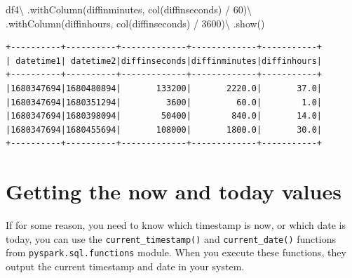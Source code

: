 \documentclass[
  11pt,
  letterpaper,
  DIV=11,
  numbers=noendperiod]{scrreprt}
\newenvironment{Shaded}{\begin{snugshade}}{\end{snugshade}}
\newcommand{\DecValTok}[1]{\textcolor[rgb]{0.68,0.00,0.00}{#1}}
\newcommand{\NormalTok}[1]{\textcolor[rgb]{0.00,0.23,0.31}{#1}}
\newcommand{\OperatorTok}[1]{\textcolor[rgb]{0.37,0.37,0.37}{#1}}
\newcommand{\StringTok}[1]{\textcolor[rgb]{0.13,0.47,0.30}{#1}}
\begin{document}
\begin{Shaded}
\begin{Highlighting}[]
\NormalTok{df4}\OperatorTok{\textbackslash{}}
\NormalTok{    .withColumn(}\StringTok{\textquotesingle{}diffinminutes\textquotesingle{}}\NormalTok{, col(}\StringTok{\textquotesingle{}diffinseconds\textquotesingle{}}\NormalTok{) }\OperatorTok{/} \DecValTok{60}\NormalTok{)}\OperatorTok{\textbackslash{}}
\NormalTok{    .withColumn(}\StringTok{\textquotesingle{}diffinhours\textquotesingle{}}\NormalTok{, col(}\StringTok{\textquotesingle{}diffinseconds\textquotesingle{}}\NormalTok{) }\OperatorTok{/} \DecValTok{3600}\NormalTok{)}\OperatorTok{\textbackslash{}}
\NormalTok{    .show()}
\end{Highlighting}
\end{Shaded}

\begin{verbatim}
+----------+----------+-------------+-------------+-----------+
| datetime1| datetime2|diffinseconds|diffinminutes|diffinhours|
+----------+----------+-------------+-------------+-----------+
|1680347694|1680480894|       133200|       2220.0|       37.0|
|1680347694|1680351294|         3600|         60.0|        1.0|
|1680347694|1680398094|        50400|        840.0|       14.0|
|1680347694|1680455694|       108000|       1800.0|       30.0|
+----------+----------+-------------+-------------+-----------+
\end{verbatim}

\hypertarget{getting-the-now-and-today-values}{%
\section{Getting the now and today
values}\label{getting-the-now-and-today-values}}

If for some reason, you need to know which timestamp is now, or which
date is today, you can use the \texttt{current\_timestamp()} and
\texttt{current\_date()} functions from \texttt{pyspark.sql.functions}
module. When you execute these functions, they output the current
timestamp and date in your system.
\end{document}
